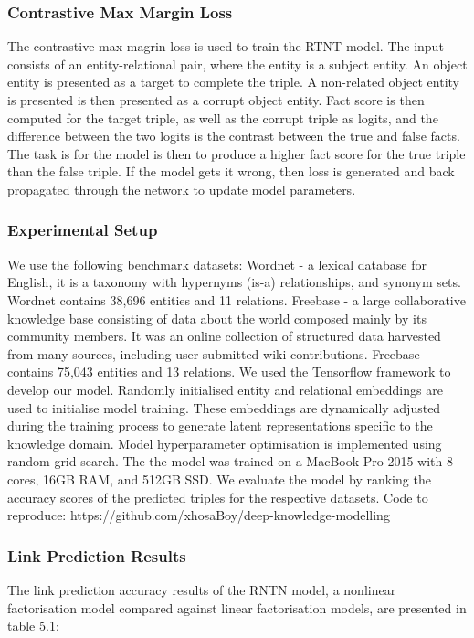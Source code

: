 \subsubsection{Contrastive Max Margin Loss}
The contrastive max-magrin loss \cite{reference} is used to train the RTNT model. The input consists of an entity-relational pair, where the entity is a subject entity. An object entity is presented as a target to complete the triple. A non-related object entity is presented is then presented as a corrupt object entity. Fact score is then computed for the target triple, as well as the corrupt triple as logits, and the difference between the two logits is the contrast between the true and false facts. The task is for the model is then to produce a higher fact score for the true triple than the false triple. If the model gets it wrong, then loss is generated and back propagated through the network to update model parameters. \newline

\subsubsection{Experimental Setup} 

We use the following benchmark datasets: Wordnet - a lexical database for English, it is a taxonomy with hypernyms (is-a) relationships, and synonym sets. Wordnet contains 38,696 entities and 11 relations.  \newline
Freebase - a large collaborative knowledge base consisting of data about the world composed mainly by its community members. It was an online collection of structured data harvested from many sources, including user-submitted wiki contributions. Freebase contains 75,043 entities and 13 relations. 
We used the Tensorflow framework to develop our model. Randomly initialised entity and relational embeddings are used to initialise model training. These embeddings are dynamically adjusted during the training process to generate latent representations specific to the knowledge domain. Model hyperparameter optimisation is implemented using random grid search. The the model was trained on a MacBook Pro 2015 with 8 cores, 16GB RAM, and 512GB SSD. \newline
We evaluate the model by ranking the accuracy scores of the predicted triples for the respective datasets. Code to reproduce: https://github.com/xhosaBoy/deep-knowledge-modelling

\subsubsection{Link Prediction Results}
The link prediction accuracy results of the RNTN model, a nonlinear factorisation model compared against linear factorisation models, are presented in table 5.1:

